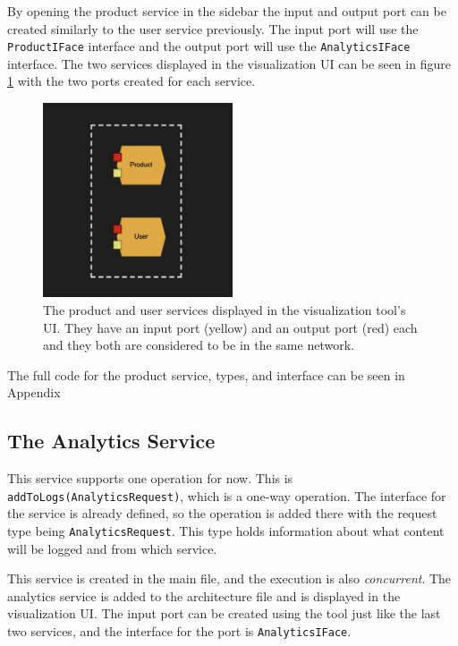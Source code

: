 By opening the product service in the sidebar the input and output port can be created similarly to the user service previously. The input port will use the \texttt{ProductIFace} interface and the output port will use the \texttt{AnalyticsIFace} interface.
The two services displayed in the visualization UI can be seen in figure \ref*{figure:jv_product_and_user} with the two ports created for each service.
\begin{figure}[h!]
    \center
    \includegraphics[width=0.5\textwidth]{figures/jv_product_and_user.png}
    \caption{The product and user services displayed in the visualization tool's UI. They have an input port (yellow) and an output port (red) each and they both are considered to be in the same network.}
    \label{figure:jv_product_and_user}
\end{figure}

The full code for the product service, types, and interface can be seen in Appendix %

\subsection{The Analytics Service}
This service supports one operation for now. This is \texttt{addToLogs(AnalyticsRequest)}, which is a one-way operation. The interface for the service is already defined, so the operation is added there with the request type being \texttt{AnalyticsRequest}. This type holds information about what content will be logged and from which service.

This service is created in the main file, and the execution is also \textit{concurrent}. The analytics service is added to the architecture file and is displayed in the visualization UI.
The input port can be created using the tool just like the last two services, and the interface for the
port is \texttt{AnalyticsIFace}.

